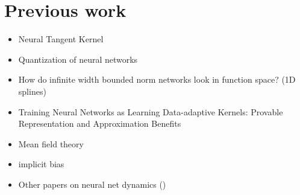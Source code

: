 \section{Previous work}
\begin{itemize}
    \item Neural Tangent Kernel
    \item Quantization of neural networks \cite{maennel2018gradient}
    \item How do infinite width bounded norm networks look in
function space? (1D splines) \cite{savarese2019infinite}
    \item Training Neural Networks as Learning Data-adaptive Kernels:
Provable Representation and Approximation Benefits \cite{dou2019training}
    \item Mean field theory
    \item implicit bias
    \item Other papers on neural net dynamics ()
\end{itemize}

